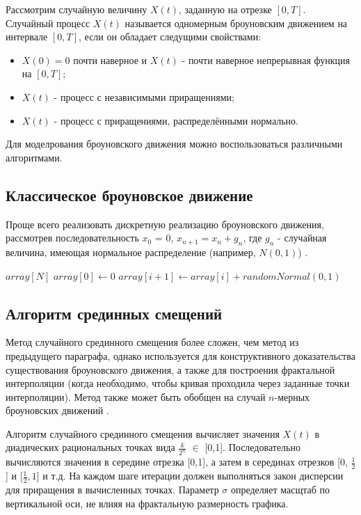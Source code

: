 Рассмотрим случайную величину $X(t)$, заданную на отрезке $[0,T]$. Случайный процесс  $X(t)$ называется одномерным броуновским движением на интервале $[0,T]$, если он обладает следущими свойствами:
\begin{itemize} 
	\item $X(0) = 0$ почти наверное и $X(t)$ - почти наверное непрерывная функция на $[0,T]$;
	\item $X(t)$ - процесс с независимыми приращениями;
	\item  $X(t)$ -  процесс с приращениями, распределёнными нормально.
\end{itemize}

Для моделрования броуновского движения можно воспользоваться различными алгоритмами.

\subsection{Классическое броуновское движение}

Проще всего реализовать дискретную реализацию броуновского движения, рассмотрев последовательность $x_0$ = 0, $x_{n+1} = x_n + g_n$, где $g_n$ - случайная величина, имеющая нормальное распределение (например, $N(0,1)$) \cite{maxima}.

\begin{algorithmic}[1]
	\State $array[N]$
	\State $array[0]\gets 0$
	\State $array[i+1]\gets array[i] + randomNormal(0,1)$
	\EndFor
\end{algorithmic}

\subsection{Алгоритм срединных смещений}

Метод случайного срединного смещения более сложен, чем метод из предыдущего параграфа, однако используется для конструктивного доказательства существования броуновского движения, а также для построения фрактальной интерполяции (когда необходимо, чтобы кривая проходила через заданные точки интерполяции). Метод также может быть обобщен на случай $n$-мерных броуновских движений \cite{maxima}.

Алгоритм случайного срединного смещения вычисляет значения $X(t)$ в диадических рациональных точках вида $\frac{k}{2^n}$ $\in$ [0,1]. Последовательно вычисляются значения в середине отрезка [0,1], а затем в серединах отрезков [0, $\frac{1}{2}$] и [$\frac{1}{2}, 1$] и т.д. На каждом шаге итерации должен выполняться закон дисперсии для приращения в вычисленных точках. Параметр $\sigma$ определяет масщтаб по вертикальной оси, не влияя на фрактальную размерность графика. 

